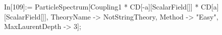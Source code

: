 In[109]:= ParticleSpectrum[Coupling1 * CD[-a][ScalarField[]] * CD[a][ScalarField[]], TheoryName -> NotStringTheory, Method -> "Easy", MaxLaurentDepth -> 3]; 